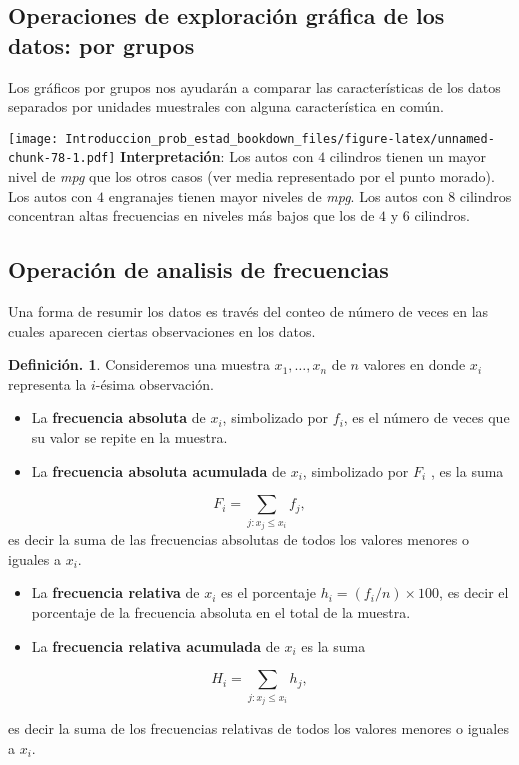 \documentclass[]{book}
\theoremstyle{definition}
\newtheorem{definition}{Definición.}[chapter]
\theoremstyle{definition}
\theoremstyle{definition}
\theoremstyle{remark}
\begin{document}
\hypertarget{operaciones-de-exploraciuxf3n-gruxe1fica-de-los-datos-por-grupos}{%
\subsection{Operaciones de exploración gráfica de los datos: por grupos}\label{operaciones-de-exploraciuxf3n-gruxe1fica-de-los-datos-por-grupos}}

Los gráficos por grupos nos ayudarán a comparar las
características de los datos separados por unidades
muestrales con alguna característica en común.

\texttt{[image: Introduccion\_prob\_estad\_bookdown\_files/figure-latex/unnamed-chunk-78-1.pdf]}
\textbf{Interpretación}: Los autos con \(4\) cilindros tienen
un mayor nivel
de \emph{mpg} que los otros casos (ver media representado por
el punto
morado). Los autos con \(4\) engranajes tienen mayor
niveles de \emph{mpg}.
Los autos con \(8\) cilindros concentran altas frecuencias
en niveles
más bajos que los de \(4\) y \(6\) cilindros.

\hypertarget{operaciuxf3n-de-analisis-de-frecuencias}{%
\subsection{Operación de analisis de frecuencias}\label{operaciuxf3n-de-analisis-de-frecuencias}}

Una forma de resumir los datos es través del conteo de
número de veces en las cuales aparecen
ciertas observaciones en los datos.

\begin{definition}
\protect\hypertarget{def:unnamed-chunk-79}{}{\label{def:unnamed-chunk-79} }Consideremos una muestra \(x_1, \ldots, x_n\) de \(n\)
valores en donde \(x_i\) representa la \(i\)-ésima
observación.

\begin{itemize}
\item
  La \textbf{frecuencia absoluta} de \(x_i\), simbolizado por
  \(f_i\), es el número de veces que su valor
  se repite en la muestra.
\item
  La \textbf{frecuencia absoluta acumulada} de \(x_i\),
  simbolizado por \(F_i\) , es la suma
\end{itemize}

\[F_i = \sum_{j: x_j \leq x_i} f_j,\]
es decir la suma de las frecuencias absolutas de todos
los valores menores o iguales a \(x_i\).

\begin{itemize}
\item
  La \textbf{frecuencia relativa} de \(x_i\) es el porcentaje
  \(h_i= (f_i/n)\times 100\), es decir el
  porcentaje de la frecuencia absoluta en el total de la
  muestra.
\item
  La \textbf{frecuencia relativa acumulada} de \(x_i\) es la
  suma
\end{itemize}

\[H_i = \sum_{j: x_j \leq x_i} h_j,\]

es decir la suma de los frecuencias relativas de todos
los valores
menores o iguales a \(x_i\).
\end{definition}
\end{document}
